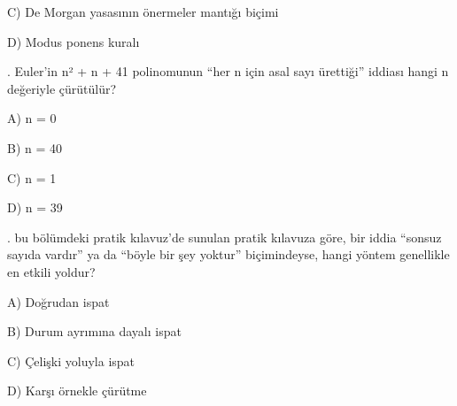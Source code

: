 \par\noindent\hspace*{1.6em}C) De Morgan yasasının önermeler mantığı biçimi

\par\noindent\hspace*{1.6em}D) Modus ponens kuralı

\par\smallskip{}. Euler’in n² + n + 41 polinomunun “her n için asal sayı ürettiği” iddiası hangi n değeriyle çürütülür?

\par\noindent\hspace*{1.6em}A) n = 0

\par\noindent\hspace*{1.6em}B) n = 40

\par\noindent\hspace*{1.6em}C) n = 1

\par\noindent\hspace*{1.6em}D) n = 39

\par\smallskip{}. bu bölümdeki pratik kılavuz’de sunulan pratik kılavuza göre, bir iddia “sonsuz sayıda vardır” ya da “böyle bir şey yoktur” biçimindeyse, hangi yöntem genellikle en etkili yoldur?

\par\noindent\hspace*{1.6em}A) Doğrudan ispat

\par\noindent\hspace*{1.6em}B) Durum ayrımına dayalı ispat

\par\noindent\hspace*{1.6em}C) Çelişki yoluyla ispat

\par\noindent\hspace*{1.6em}D) Karşı örnekle çürütme

\clearpage

\clearpage